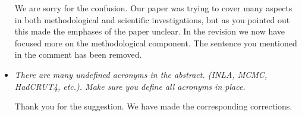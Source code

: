 \documentclass[11pt]{article}
\newcommand{\bl}[1]{\color{red}\textbf{[Bo: #1]}\normalcolor}
\begin{document}
\begin{itemize}
We are sorry for the confusion. Our paper was trying to cover many aspects in both methodological and scientific investigations, but as you pointed out this made the emphases of the paper unclear. In the revision we now have focused more on the methodological component. The sentence you mentioned in the comment has been removed.  


\item \textit{There are many undefined acronyms in the abstract. (INLA, MCMC,
    HadCRUT4, etc.). Make sure you define all acronyms in place.}

Thank you for the suggestion. We have made the corresponding corrections.


\end{itemize}



\end{document}
